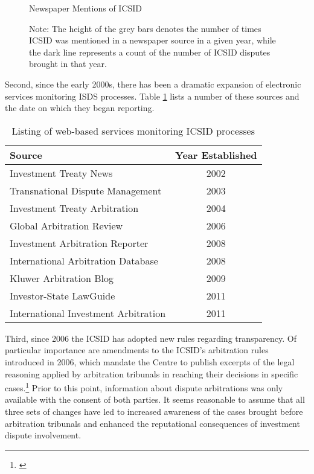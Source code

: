 \documentclass[12pt,onesided]{amsart}
\begin{document}
\begin{figure}[ht]
	\centering
	\caption{Newspaper Mentions of ICSID}
	\label{fig:icsidMedia}
	\resizebox{.8\textwidth}{!}{}
	\caption*{Note: The height of the grey bars denotes the number of times ICSID was mentioned in a newspaper source in a given year, while the dark line represents a count of the number of ICSID disputes brought in that year.}
\end{figure}
\FloatBarrier

Second, since the early 2000s, there has been a dramatic expansion of electronic services monitoring ISDS processes. Table \ref{tab:disputeSites} lists a number of these sources and the date on which they began reporting. 

\begin{table}[ht]
\centering
\caption{Listing of web-based services monitoring ICSID processes}
\label{tab:disputeSites}
\begin{tabular}{lc}
	\hline\hline
	Source & Year Established \\
	\hline
	Investment Treaty News & 2002 \\
	Transnational Dispute Management & 2003 \\
	Investment Treaty Arbitration & 2004 \\
	Global Arbitration Review & 2006 \\
	Investment Arbitration Reporter & 2008 \\
	International Arbitration Database & 2008 \\
	Kluwer Arbitration Blog & 2009 \\
	Investor-State LawGuide & 2011 \\
	International Investment Arbitration & 2011 \\
	\hline\hline
\end{tabular}
\end{table}
\FloatBarrier

Third, since 2006 the ICSID has adopted new rules regarding transparency. Of particular importance are amendments to the ICSID's arbitration rules introduced in 2006, which mandate the Centre to publish excerpts of the legal reasoning applied by arbitration tribunals in reaching their decisions in specific cases.\footnote{\citet{yackee20112006,antonietti:2006}} Prior to this point, information about dispute arbitrations was only available with the consent of both parties. It seems reasonable to assume that all three sets of changes have led to increased awareness of the cases brought before arbitration tribunals and enhanced the reputational consequences of investment dispute involvement.
\end{document}
